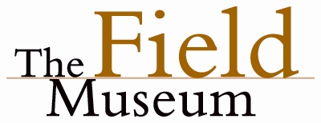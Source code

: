\documentclass{beamer}
\begin{document}
\begin{frame}
\begin{columns}
\begin{column}{0.5\textwidth}
      \includegraphics[height = 0.25\textheight, width = \textwidth, keepaspectratio = true]{figure/field} \\
    \end{column}
  \end{columns}
\end{frame}


\end{document}
